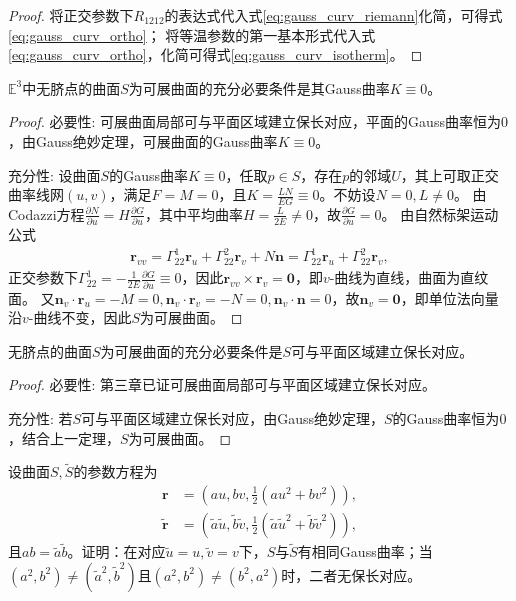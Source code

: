 \documentclass[../../main.tex]{subfiles}%
\begin{document}
\begin{proof}
将正交参数下$R_{1212}$的表达式代入式\eqref{eq:gauss_curv_riemann}化简，可得式\eqref{eq:gauss_curv_ortho}；
将等温参数的第一基本形式代入式\eqref{eq:gauss_curv_ortho}，化简可得式\eqref{eq:gauss_curv_isotherm}。
\end{proof}

\begin{theorem}
$\mathbb{E}^3$中无脐点的曲面$S$为可展曲面的充分必要条件是其Gauss曲率$K\equiv0$。
\end{theorem}
\begin{proof}

{\heiti 必要性}: 可展曲面局部可与平面区域建立保长对应，平面的Gauss曲率恒为$0$，由Gauss绝妙定理，可展曲面的Gauss曲率$K\equiv0$。

{\heiti 充分性}: 设曲面$S$的Gauss曲率$K\equiv0$，任取$p\in S$，存在$p$的邻域$U$，其上可取正交曲率线网$(u,v)$，满足$F=M=0$，且$K=\frac{LN}{EG}\equiv0$。不妨设$N=0,L\neq0$。
由Codazzi方程$\frac{\partial N}{\partial u}=H\frac{\partial G}{\partial u}$，其中平均曲率$H=\frac{L}{2E}\neq0$，故$\frac{\partial G}{\partial u}=0$。
由自然标架运动公式
\begin{align*}
\boldsymbol{r}_{vv}=\Gamma^1_{22}\boldsymbol{r}_u+\Gamma^2_{22}\boldsymbol{r}_v+N\boldsymbol{n}=\Gamma^1_{22}\boldsymbol{r}_u+\Gamma^2_{22}\boldsymbol{r}_v,
\end{align*}
正交参数下$\Gamma^1_{22}=-\frac{1}{2E}\frac{\partial G}{\partial u}\equiv0$，因此$\boldsymbol{r}_{vv}\times\boldsymbol{r}_v=\boldsymbol{0}$，即$v$-曲线为直线，曲面为直纹面。
又$\boldsymbol{n}_v\cdot\boldsymbol{r}_u=-M=0,\boldsymbol{n}_v\cdot\boldsymbol{r}_v=-N=0,\boldsymbol{n}_v\cdot\boldsymbol{n}=0$，故$\boldsymbol{n}_v=\boldsymbol{0}$，即单位法向量沿$v$-曲线不变，因此$S$为可展曲面。
\end{proof}

\begin{theorem}
无脐点的曲面$S$为可展曲面的充分必要条件是$S$可与平面区域建立保长对应。
\end{theorem}
\begin{proof}

{\heiti 必要性}: 第三章已证可展曲面局部可与平面区域建立保长对应。

{\heiti 充分性}: 若$S$可与平面区域建立保长对应，由Gauss绝妙定理，$S$的Gauss曲率恒为$0$，结合上一定理，$S$为可展曲面。
\end{proof}

\begin{example}
设曲面$S,\tilde{S}$的参数方程为
\begin{align*}
\boldsymbol{r} &= \left(au,bv,\frac{1}{2}(au^2+bv^2)\right),\\
\tilde{\boldsymbol{r}} &= \left(\tilde{a}\tilde{u},\tilde{b}\tilde{v},\frac{1}{2}(\tilde{a}\tilde{u}^2+\tilde{b}\tilde{v}^2)\right),
\end{align*}
且$ab=\tilde{a}\tilde{b}$。证明：在对应$\tilde{u}=u,\tilde{v}=v$下，$S$与$\tilde{S}$有相同Gauss曲率；当$(a^2,b^2)\neq(\tilde{a}^2,\tilde{b}^2)$且$(a^2,b^2)\neq(b^2,a^2)$时，二者无保长对应。
\end{example}
\end{document}

